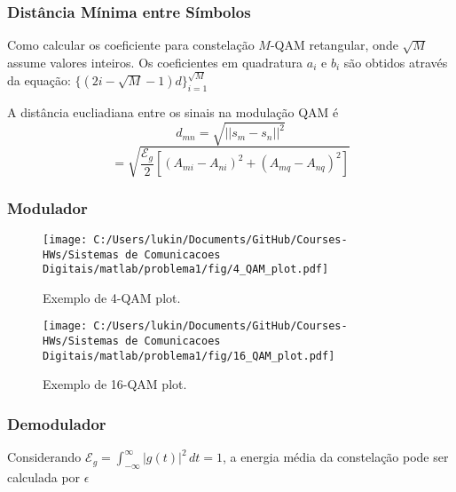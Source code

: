 \subsubsection{Distância Mínima entre Símbolos}

Como calcular os coeficiente para constelação $M$-QAM retangular, onde $\sqrt{M}$ assume valores inteiros. Os coeficientes em quadratura $a_i$ e $b_i$ são obtidos através da equação: $\{ (2i -\sqrt{M} - 1)d \}_{i=1}^{\sqrt{M}} $ 

A distância eucliadiana entre os sinais na modulação QAM é
$$ d_{mn} = \sqrt{|| s_m - s_n||^2}$$ 
$$ = \sqrt{\frac{\mathcal{E}_g}{2}[(A_{mi} - A_{ni})^2 + (A_{mq} - A_{nq})^2]}$$
\subsubsection{Modulador}

\begin{figure}[!ht]
    \centering
    \texttt{[image: C:/Users/lukin/Documents/GitHub/Courses-HWs/Sistemas de Comunicacoes Digitais/matlab/problema1/fig/4\_QAM\_plot.pdf]}
    \caption{Exemplo de 4-QAM plot.}
    \label{fig:4_QAM_plot}
\end{figure}

\begin{figure}[!ht]
    \centering
    \texttt{[image: C:/Users/lukin/Documents/GitHub/Courses-HWs/Sistemas de Comunicacoes Digitais/matlab/problema1/fig/16\_QAM\_plot.pdf]}
    \caption{Exemplo de 16-QAM plot.}
    \label{fig:16_QAM_plot}
\end{figure}



\subsubsection{Demodulador}

Considerando $\mathcal{E}_g = \int_{-\infty}^{\infty} |g(t)|^2 \,dt = 1$, a energia média da constelação pode ser calculada por $\epsilon$



